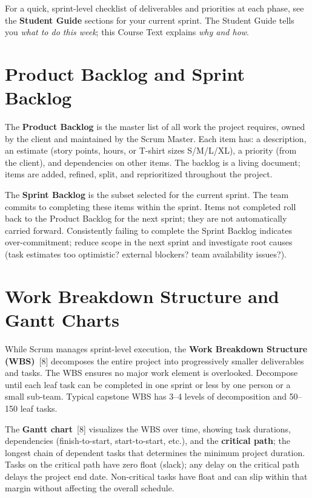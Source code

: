 \begin{tipbox}
For a quick, sprint-level checklist of deliverables and priorities at each phase, see the \textbf{Student Guide} sections for your current sprint. The Student Guide tells you \emph{what to do this week}; this Course Text explains \emph{why and how}.
\end{tipbox}


\section{Product Backlog and Sprint Backlog}
The \textbf{Product Backlog} is the master list of all work the project requires, owned by the client and maintained by the Scrum Master. Each item has: a description, an estimate (story points, hours, or T-shirt sizes S/M/L/XL), a priority (from the client), and dependencies on other items. The backlog is a living document; items are added, refined, split, and reprioritized throughout the project.

The \textbf{Sprint Backlog} is the subset selected for the current sprint. The team commits to completing these items within the sprint. Items not completed roll back to the Product Backlog for the next sprint; they are not automatically carried forward. Consistently failing to complete the Sprint Backlog indicates over-commitment; reduce scope in the next sprint and investigate root causes (task estimates too optimistic? external blockers? team availability issues?).

\section{Work Breakdown Structure and Gantt Charts}
While Scrum manages sprint-level execution, the \textbf{Work Breakdown Structure (WBS)}~[8] decomposes the entire project into progressively smaller deliverables and tasks. The WBS ensures no major work element is overlooked. Decompose until each leaf task can be completed in one sprint or less by one person or a small sub-team. Typical capstone WBS has 3--4 levels of decomposition and 50--150 leaf tasks.

The \textbf{Gantt chart}~[8] visualizes the WBS over time, showing task durations, dependencies (finish-to-start, start-to-start, etc.), and the \textbf{critical path}; the longest chain of dependent tasks that determines the minimum project duration. Tasks on the critical path have zero float (slack); any delay on the critical path delays the project end date. Non-critical tasks have float and can slip within that margin without affecting the overall schedule.

